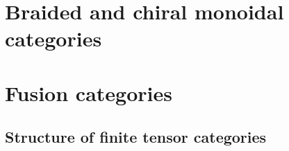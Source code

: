             \minitoc
            
            
            
            
        
        \chapter{Braided and chiral monoidal categories}
            \begin{abstract}
                
            \end{abstract}
            
            \minitoc
            
            
            
            
        
        \chapter{Fusion categories}
            \begin{abstract}
                
            \end{abstract}
            
            \minitoc
            
            
            
            
            
            
        
        \begin{appendices}
            \chapter{Structure of finite tensor categories}
                \begin{abstract}
                
                \end{abstract}
                
                \minitoc
            
                
                
                
        \end{appendices}
	
	\printbibliography

